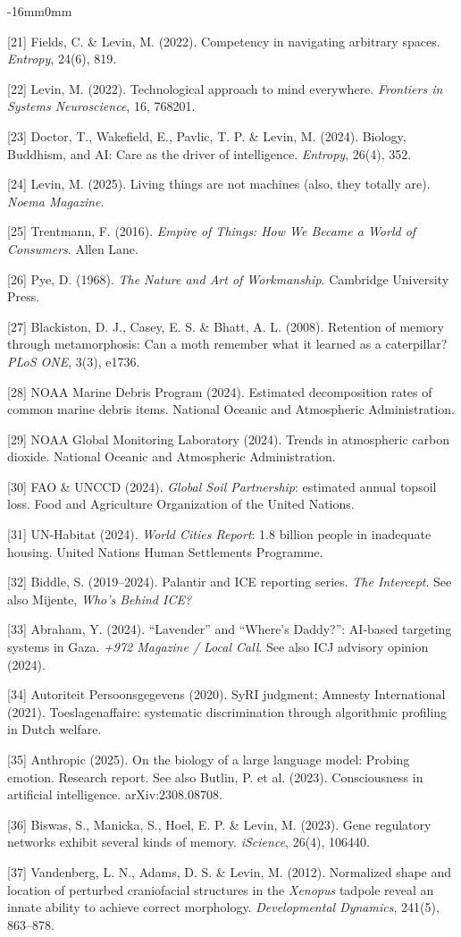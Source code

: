 \documentclass[10pt,oneside]{book}
\newcommand{\refentry}[1]{%
  \par\addvspace{0pt}%
  \begingroup\footnotesize\linespread{0.92}\selectfont
  \noindent\hangindent=4mm\hangafter=1 #1\par%
  \endgroup
}
\newenvironment{widebody}{%
  \begin{adjustwidth}{-16mm}{0mm}%
}{%
  \end{adjustwidth}%
}
\begin{document}
\begin{widebody}
\refentry{[21] Fields, C. \& Levin, M. (2022). Competency in navigating arbitrary spaces. \textit{Entropy}, 24(6), 819.}
\refentry{[22] Levin, M. (2022). Technological approach to mind everywhere. \textit{Frontiers in Systems Neuroscience}, 16, 768201.}
\refentry{[23] Doctor, T., Wakefield, E., Pavlic, T. P. \& Levin, M. (2024). Biology, Buddhism, and AI: Care as the driver of intelligence. \textit{Entropy}, 26(4), 352.}
\refentry{[24] Levin, M. (2025). Living things are not machines (also, they totally are). \textit{Noema Magazine}.}
\refentry{[25] Trentmann, F. (2016). \textit{Empire of Things: How We Became a World of Consumers}. Allen Lane.}
\refentry{[26] Pye, D. (1968). \textit{The Nature and Art of Workmanship}. Cambridge University Press.}
\refentry{[27] Blackiston, D. J., Casey, E. S. \& Bhatt, A. L. (2008). Retention of memory through metamorphosis: Can a moth remember what it learned as a caterpillar? \textit{PLoS ONE}, 3(3), e1736.}
\refentry{[28] NOAA Marine Debris Program (2024). Estimated decomposition rates of common marine debris items. National Oceanic and Atmospheric Administration.}
\refentry{[29] NOAA Global Monitoring Laboratory (2024). Trends in atmospheric carbon dioxide. National Oceanic and Atmospheric Administration.}
\refentry{[30] FAO \& UNCCD (2024). \textit{Global Soil Partnership}: estimated annual topsoil loss. Food and Agriculture Organization of the United Nations.}
\refentry{[31] UN-Habitat (2024). \textit{World Cities Report}: 1.8 billion people in inadequate housing. United Nations Human Settlements Programme.}
\refentry{[32] Biddle, S. (2019--2024). Palantir and ICE reporting series. \textit{The Intercept}. See also Mijente, \textit{Who's Behind ICE?}}
\refentry{[33] Abraham, Y. (2024). ``Lavender'' and ``Where's Daddy?'': AI-based targeting systems in Gaza. \textit{+972 Magazine / Local Call}. See also ICJ advisory opinion (2024).}
\refentry{[34] Autoriteit Persoonsgegevens (2020). SyRI judgment; Amnesty International (2021). Toeslagenaffaire: systematic discrimination through algorithmic profiling in Dutch welfare.}
\refentry{[35] Anthropic (2025). On the biology of a large language model: Probing emotion. Research report. See also Butlin, P. et al. (2023). Consciousness in artificial intelligence. arXiv:2308.08708.}
\refentry{[36] Biswas, S., Manicka, S., Hoel, E. P. \& Levin, M. (2023). Gene regulatory networks exhibit several kinds of memory. \textit{iScience}, 26(4), 106440.}
\refentry{[37] Vandenberg, L. N., Adams, D. S. \& Levin, M. (2012). Normalized shape and location of perturbed craniofacial structures in the \textit{Xenopus} tadpole reveal an innate ability to achieve correct morphology. \textit{Developmental Dynamics}, 241(5), 863--878.}

\end{widebody}
\end{document}
